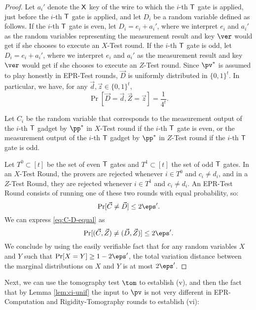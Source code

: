 \begin{proof}
Let $a_i'$ denote the $\sf X$ key of the wire to which the $i$-th $\sf T$ gate is applied, just before the $i$-th $\sf T$ gate is applied, and let $D_i$ be a random variable defined as follows. If the $i$-th $\sf T$ gate is even, let $D_i=e_i+a_i'$, where we interpret $e_i$ and $a_i'$ as the random variables representing the measurement result and key $\ver$ would get if she chooses to execute an $X$-Test round. If the $i$-th $\sf T$ gate is odd, let $D_i=e_i+a_i'$, where we interpret $e_i$ and $a_i'$ as the measurement result and key $\ver$ would get if she chooses to execute an $Z$-Test round. Since $\pv^*$ is assumed to play honestly in EPR-Test rounds, $\vec{D}$ is uniformly distributed in $\{0,1\}^t$. In particular, we have, for any $\vec{d},\vec{z}\in\{0,1\}^t$,
\begin{equation}
\Pr[\vec{D}=\vec{d},\vec{Z}=\vec{z}]=\frac{1}{4^t}.\label{eq:D-unif}
\end{equation}

Let $C_i$ be the random variable that corresponds to the measurement output of
  the $i$-th $\sf T$ gadget by $\pp^*$ in $X$-Test round if the $i$-th $\sf T$
  gate is even, or the measurement output of the $i$-th $\sf T$ gadget 
  by $\pp^*$ in $Z$-Test round if the $i$-th $\sf T$ gate is odd.

Let $T^0\subset[t]$ be the set of even $\sf T$ gates and $T^1\subset[t]$ the set of odd $\sf T$ gates. In an $X$-Test Round, the provers are rejected whenever $i\in T^0$ and $c_i\neq d_i$, and in a $Z$-Test Round, they are rejected whenever $i\in T^1$ and $c_i\neq d_i$. An EPR-Test Round consists of running one of these two rounds with equal probability, so:
\begin{equation}
\Pr[\vec{C}\neq\vec{D}]  \leq  2\eps'.\label{eq:C-D-equal}
\end{equation}
We can express \eqref{eq:C-D-equal} as
\begin{equation*}
\Pr[(\vec{C},\vec{Z})\neq(\vec{D},\vec{Z})]  \leq  2\eps'.
\end{equation*}
We conclude by using the easily verifiable fact that for any random variables $X$ and $Y$ such that $\Pr[X= Y]\geq 1-2\eps'$, the total variation distance between the marginal distributions on $X$ and $Y$ is at most $2\eps'$. 
\end{proof}

Next, we can use the tomography test $\tom$ to establish (v), and then the fact that by Lemma \ref{lem:ci-unif} the input to $\pv$ is not very different in EPR-Computation and Rigidity-Tomography rounds to establish (vi):

